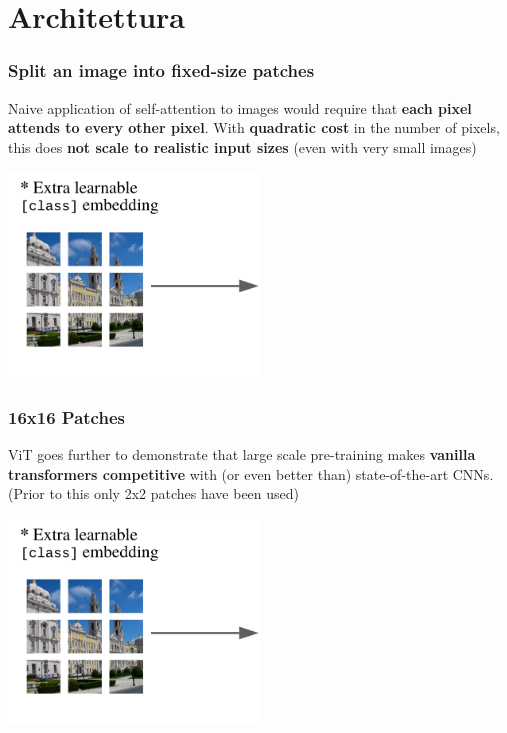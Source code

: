 \section{Architettura}


\begin{frame}
\frametitle{Split an image into fixed-size patches}

Naive application of self-attention to images would require that \textbf{each pixel attends to every other pixel}. With \textbf{quadratic cost} in the number of pixels, this does \textbf{not scale to realistic input sizes} (even with very small images)

\begin{center}
    \includegraphics[width=0.5\textwidth]{img/2-section/Patching.png} 
\end{center}
\end{frame}

\begin{frame}
\frametitle{16x16 Patches}

 ViT goes further to demonstrate that large scale pre-training makes \textbf{vanilla transformers competitive} with (or even better than) state-of-the-art CNNs. (Prior to this only 2x2 patches have been used)

\begin{center}
    \includegraphics[width=0.5\textwidth]{img/2-section/Patching.png} 
\end{center}
\end{frame}


